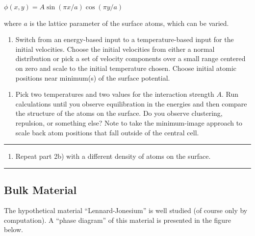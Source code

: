 \documentclass[11pt]{article}
\providecommand{\tightlist}{%
      \setlength{\itemsep}{0pt}\setlength{\parskip}{0pt}}
\begin{document}
\(\phi(x,y) = A\sin(\pi x/a)\cos(\pi y/a)\)

where \(a\) is the lattice parameter of the surface atoms, which can be
varied.

    \begin{enumerate}
\def\labelenumi{\alph{enumi})}
\tightlist
\item
  Switch from an energy-based input to a temperature-based input for the
  initial velocities. Choose the initial velocities from either a normal
  distribution or pick a set of velocity components over a small range
  centered on zero and scale to the initial temperature chosen. Choose
  initial atomic positions near minimum(s) of the surface potential.
\end{enumerate}

    \begin{enumerate}
\def\labelenumi{\alph{enumi})}
\setcounter{enumi}{1}
\tightlist
\item
  Pick two temperatures and two values for the interaction strength
  \(A\). Run calculations until you observe equilibration in the
  energies and then compare the structure of the atoms on the surface.
  Do you observe clustering, repulsion, or something else? Note to take
  the minimum-image approach to scale back atom positions that fall
  outside of the central cell.
\end{enumerate}

\begin{center}\rule{0.5\linewidth}{0.5pt}\end{center}

    \begin{enumerate}
\def\labelenumi{\arabic{enumi}.}
\setcounter{enumi}{2}
\tightlist
\item
  Repeat part 2b) with a different density of atoms on the surface.
\end{enumerate}

\begin{center}\rule{0.5\linewidth}{0.5pt}\end{center}

    \hypertarget{bulk-material}{%
\subsection{Bulk Material}\label{bulk-material}}

    The hypothetical material ``Lennard-Jonesium'' is well studied (of
course only by computation). A ``phase diagram'' of this material is
presented in the figure below.
\end{document}
